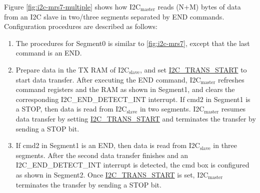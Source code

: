 \documentclass[main\_\_EN.tex]{subfiles}
\begin{document}
Figure \ref{fig:i2c-mrs7-multiple}  shows how I2C$_\text{master}$ reads (N+M) bytes of data from an I2C slave in two/three segments separated by END commands. Configuration procedures are described as follows:
\begin{enumerate}
    \item The procedures for Segment0 is similar to \ref{fig:i2c-mrs7}, except that the last command is an END.
    \item Prepare data in the TX RAM of I2C$_\text{slave}$, and set \hyperref[fielddesc:I2CTRANSSTART]{I2C\_TRANS\_START} to start data transfer. After executing the END command, I2C$_\text{master}$ refreshes command registers and the RAM as shown in Segment1, and clears the corresponding I2C\_END\_DETECT\_INT interrupt. If cmd2 in Segment1 is a STOP, then data is read from I2C$_\text{slave}$ in two segments. I2C$_\text{master}$ resumes data transfer by setting \hyperref[fielddesc:I2CTRANSSTART]{I2C\_TRANS\_START} and terminates the transfer by sending a STOP bit.
    \item If cmd2 in Segment1 is an END, then data is read from I2C$_\text{slave}$ in three segments. After the second data transfer finishes and an I2C\_END\_DETECT\_INT interrupt is detected, the cmd box is configured as shown in Segment2. Once \hyperref[fielddesc:I2CTRANSSTART]{I2C\_TRANS\_START} is set, I2C$_\text{master}$ terminates the transfer by sending a STOP bit.

\end{enumerate}
\end{document}
